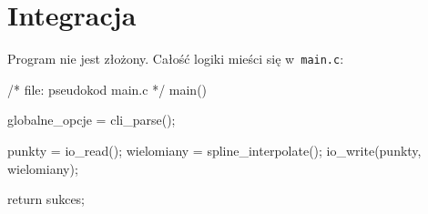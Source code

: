 \documentclass[12pt,a4paper]{article}
\newcommand{\p}[1]{\texttt{#1}}
\begin{document}
\section{Integracja}

Program nie jest złożony. Całość logiki mieści się w~\p{main.c}:
\begin{SmallVerbatim}
    /* file: pseudokod main.c */
    main()
    {
      globalne_opcje = cli_parse();

      punkty = io_read();
      wielomiany = spline_interpolate();
      io_write(punkty, wielomiany);
      
      return sukces;
    }
\end{SmallVerbatim}
\end{document}

